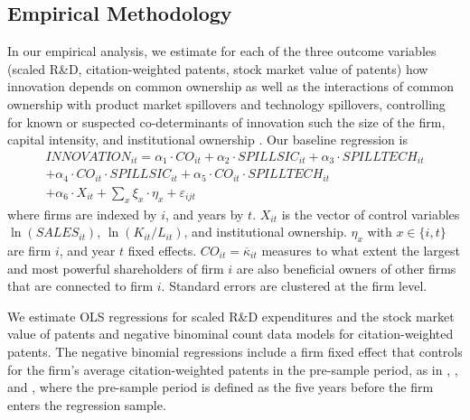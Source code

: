 \documentclass[12pt]{article}
\begin{document}

\subsection{Empirical Methodology}

In our empirical analysis, we estimate for each of the three outcome variables (scaled R\&D, citation-weighted patents, stock market value of patents) how innovation depends on common ownership as well as the interactions of common ownership with product market spillovers and technology spillovers, controlling for known or suspected co-determinants of innovation such the size of the firm, capital intensity, and institutional ownership \citep{aghion2013innovation}. Our baseline regression is
\begin{multline}\label{eq:baseline}
\mathit{INNOVATION}_{it}= \alpha_{1} \cdot \mathit{CO}_{it} + \alpha_{2} \cdot \mathit{SPILLSIC}_{it} + \alpha_{3}  \cdot \mathit{SPILLTECH}_{it} \\ 
+ \alpha_{4} \cdot \mathit{CO}_{it} \cdot \mathit{SPILLSIC}_{it} + \alpha_{5} \cdot \mathit{CO}_{it} \cdot \mathit{SPILLTECH}_{it} \\
+ \alpha_{6} \cdot X_{it} + \sum_x \xi_{x} \cdot \eta_x + \varepsilon_{ijt}
\end{multline}
where firms are indexed by $i$, and years by $t$. $X_{it}$ is the vector of control variables $\ln(\mathit{SALES}_{it})$, $\ln(K_{it}/L_{it})$, and institutional ownership. $\eta_x$ with $x \in \{i,t\}$ are firm $i$, and year $t$ fixed effects. $CO_{it} = \overline{\kappa}_{it}$ measures to what extent the largest and most powerful shareholders of firm $i$ are also beneficial owners of other firms that are connected to firm $i$. Standard errors are clustered at the firm level.

We estimate OLS regressions for scaled R\&D expenditures and the stock market value of patents and negative binominal count data models for citation-weighted patents. The negative binomial regressions include a firm fixed effect that controls for the firm's average citation-weighted patents in the pre-sample period, as in \cite{blundell1999market}, \cite{bloom2013}, and \cite{lucking2018spillovers}, where the pre-sample period is defined as the five years before the firm enters the regression sample. 
\end{document}
